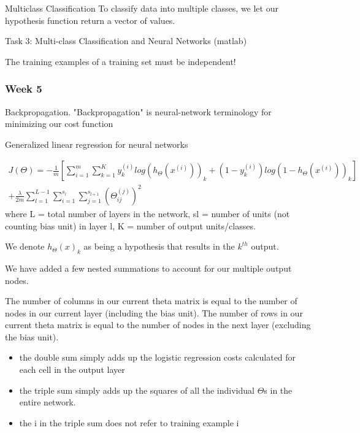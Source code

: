 \documentclass[12pt,a4paper]{report}
\begin{document}
	Multiclass Classification
	To classify data into multiple classes, we let our hypothesis function return a vector of values. 
	
	Task 3: Multi-class Classification and Neural Networks (matlab)
	
	The training examples of a training set must be independent!
	\subsubsection{Week 5}
	
	Backpropagation. "Backpropagation" is neural-network terminology for minimizing our cost function
	
	Generalized linear regression for neural networks
	
	 \begin{multline}
	 J(\Theta) = -\frac{1}{m} \left[ \sum_{i = 1}^{m}\sum_{k = 1}^{K} y_{k}^{(i)} log(h_{\Theta}(x^{(i)}))_{k} + (1-y_{k}^{(i)})log(1-h_{\Theta}(x^{(i)}))_{k}\right]\\
	  + \frac{\lambda}{2m} \sum_{l = 1}^{L-1} \sum_{i = 1}^{s_{l}} \sum_{j = 1}^{s_{l+1}} (\Theta_{ij}^{(j)})^{2}
	 \end{multline}
	where L = total number of layers in the network, sl = number of units (not counting bias unit) in layer l, K = number of output units/classes.
	
	We denote $h_{\Theta}(x)_{k}$ as being a hypothesis that results in the $k^{th}$ output.
	
	We have added a few nested summations to account for our multiple output nodes. 
	
	The number of columns in our current theta matrix is equal to the number of nodes in our current layer (including the bias unit). The number of rows in our current theta matrix is equal to the number of nodes in the next layer (excluding the bias unit).
	
	\begin{itemize}
	\item the double sum simply adds up the logistic regression costs calculated for each cell in the output layer
\item the triple sum simply adds up the squares of all the individual $\Theta$s in the entire network.
\item the i in the triple sum does not refer to training example i
	\end{itemize}
	
\end{document}

